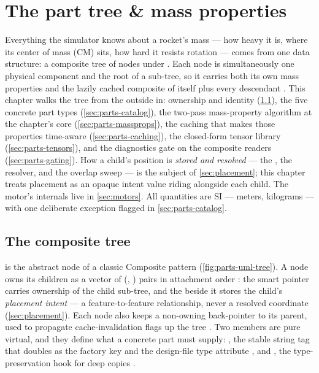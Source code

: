 \section{The part tree \& mass properties}\label{sec:parts}

Everything the simulator knows about a rocket's mass --- how heavy it is, where its center of
mass (CM) sits, how hard it resists rotation --- comes from one data structure: a composite
tree of  nodes under . Each node is simultaneously one physical
component and the root of a sub-tree, so it carries both its own mass properties and the lazily
cached composite of itself plus every descendant . This chapter
walks the tree from the outside in: ownership and identity (\cref{sec:parts-tree}), the five
concrete part types (\cref{sec:parts-catalog}), the two-pass mass-property algorithm at the
chapter's core (\cref{sec:parts-massprops}), the caching that makes those properties
time-aware (\cref{sec:parts-caching}), the closed-form tensor library
(\cref{sec:parts-tensors}), and the diagnostics gate on the composite readers
(\cref{sec:parts-gating}). How a child's position is \emph{stored and resolved} --- the
, the resolver, and the overlap sweep --- is the subject of
\cref{sec:placement}; this chapter treats placement as an opaque intent value riding alongside
each child. The motor's internals live in \cref{sec:motors}. All quantities are SI --- meters,
kilograms --- with one deliberate exception flagged in \cref{sec:parts-catalog}.

\subsection{The composite tree}\label{sec:parts-tree}

 is the abstract node of a classic Composite pattern
(\cref{fig:parts-uml-tree}). A node owns its children as a vector of
(, ) pairs in attachment order
: the smart pointer carries ownership of the child sub-tree, and
the  beside it stores the child's \emph{placement intent} --- a
feature-to-feature relationship, never a resolved coordinate
(\cref{sec:placement}). Each node also keeps a non-owning back-pointer to its parent, used to
propagate cache-invalidation flags up the tree
. Two members are pure virtual, and they define what a concrete
part must supply: , the stable string tag that doubles as the factory key and
the design-file type attribute , and , the
type-preservation hook for deep copies .

